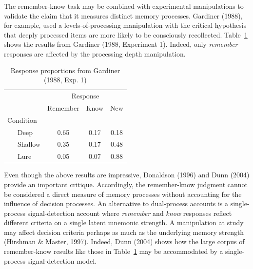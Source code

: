 \documentclass[english,,man,floatsintext]{apa6}
\begin{document}
The remember-know task may be combined with experimental manipulations to validate the claim that it measures distinct memory processes. Gardiner (1988), for example, used a levels-of-processing manipulation with the critical hypothesis that deeply processed items are more likely to be consciously recollected.
Table~\ref{tab:tab1} shows the results from Gardiner (1988, Experiment 1). Indeed, only \emph{remember} responses are affected by the processing depth manipulation.

\begin{table}[tbp]

\begin{center}
\begin{threeparttable}

\caption{\label{tab:tab1}Response proportions from Gardiner (1988, Exp. 1)}

\begin{tabular}{lccc}
\toprule
 & \multicolumn{3}{c}{Response} \\
\cmidrule(r){2-4}
 & \multicolumn{1}{c}{Remember} & \multicolumn{1}{c}{Know} & \multicolumn{1}{c}{New}\\
\midrule
Condition &  &  & \\
\ \ \ Deep & 0.65 & 0.17 & 0.18\\
\ \ \ Shallow & 0.35 & 0.17 & 0.48\\
\ \ \ Lure & 0.05 & 0.07 & 0.88\\
\bottomrule
\end{tabular}

\end{threeparttable}
\end{center}

\end{table}

Even though the above results are impressive, Donaldson (1996) and Dunn (2004) provide an important critique. Accordingly, the remember-know judgment cannot be considered a direct measure of memory processes without accounting for the influence of decision processes.
An alternative to dual-process accounts is a single-process signal-detection account where \emph{remember} and \emph{know} responses reflect different criteria on a single latent mnemonic strength.
A manipulation at study may affect decision criteria perhaps as much as the underlying memory strength (Hirshman \& Master, 1997). Indeed, Dunn (2004) shows how the large corpus of remember-know results like those in Table~\ref{tab:tab1} may be accommodated by a single-process signal-detection model.
\end{document}
